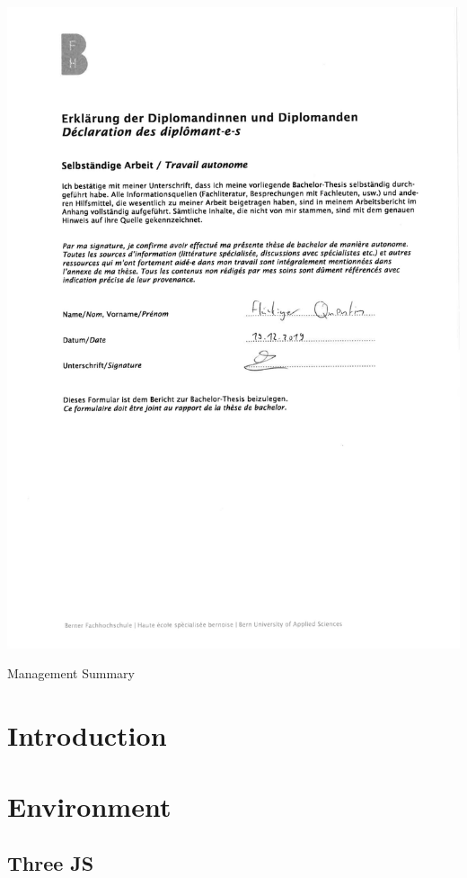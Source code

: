 \documentclass{scrbook}
\begin{document}
\includegraphics[width=\textwidth]{./Declaration_of_authonomy-1}
\clearpage
\clearpage

Management Summary
\clearpage
\clearpage

\tableofcontents
\clearpage

\chapter{Introduction}

\chapter{Environment}

\section{Three JS}
\end{document}
